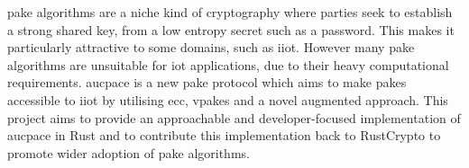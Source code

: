 \gls{pake} algorithms are a niche kind of cryptography where parties seek
to establish a strong shared key, from a low entropy secret such as a password.
This makes it particularly attractive to some domains, such as \gls{iiot}.
However many \gls{pake} algorithms are unsuitable for \gls{iot} applications, due
to their heavy computational requirements. \gls{aucpace} is a new \gls{pake}
protocol which aims to make \glspl{pake} accessible to \gls{iiot} by utilising
\gls{ecc}, \glspl{vpake} and a novel augmented approach. This project aims to
provide an approachable and developer-focused implementation of \gls{aucpace}
in Rust and to contribute this implementation back to RustCrypto to promote wider
adoption of \gls{pake} algorithms.
